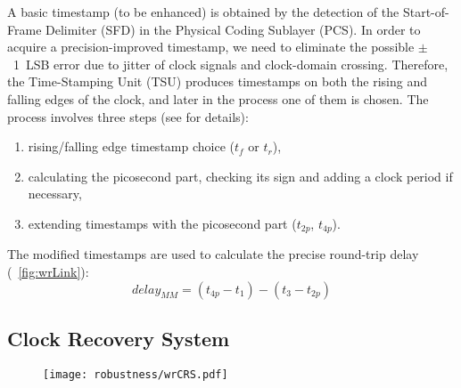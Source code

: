 A basic timestamp (to be enhanced) is obtained by the detection of 
the Start-of-Frame Delimiter (SFD) in the Physical Coding Sublayer (PCS).
In order to acquire a precision-improved timestamp, we need to eliminate the possible 
$\pm$~1~LSB error  %
due to jitter of clock signals and clock-domain crossing. 
Therefore, the Time-Stamping Unit (TSU) produces timestamps on both the rising 
and falling edges of the clock, and later in the process one of them is chosen.
The process involves three steps (see \cite{biblio:TomekMSc} for details):
\begin{enumerate}
   \item rising/falling edge timestamp choice ($t_f$ or $t_r$),
   \item calculating the picosecond part, checking
         its sign and adding a clock period if necessary,
   \item extending timestamps with the picosecond part ($t_{2p}$, $t_{4p}$).
 \end{enumerate}
The modified timestamps are used to calculate the precise round-trip delay
(\figurename~\ref{fig:wrLink}):
\begin{equation}
  \label{eq:delaymm}
  delay_{MM} = (t_{4p}-t_{1}) - (t_{3}-t_{2p})
\end{equation}




\subsection{ Clock Recovery System}
\label{sec:wrCRS}

\begin{figure}[!t]
\centering
\texttt{[image: robustness/wrCRS.pdf]}
\caption{}
\label{fig:PLL}
\end{figure}


